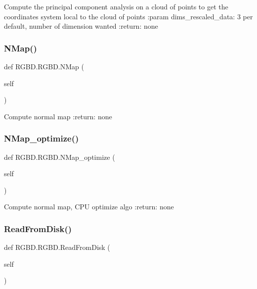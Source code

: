 \begin{DoxyVerb}Compute the principal component analysis on a cloud of points
to get the coordinates system local to the cloud of points
:param dims_rescaled_data: 3 per default, number of dimension wanted
:return:  none
\end{DoxyVerb}
 \mbox{\label{class_r_g_b_d_1_1_r_g_b_d_a9cba8018f1cdb3f5c73c863a49549061}} 
\subsubsection{N\+Map()}
{\footnotesize\ttfamily def R\+G\+B\+D.\+R\+G\+B\+D.\+N\+Map (\begin{DoxyParamCaption}\item[{}]{self }\end{DoxyParamCaption})}

\begin{DoxyVerb}Compute normal map
:return: none
\end{DoxyVerb}
 \mbox{\label{class_r_g_b_d_1_1_r_g_b_d_ae269b01a123ea0c10cd0317b510e7ef9}} 
\subsubsection{N\+Map\+\_\+optimize()}
{\footnotesize\ttfamily def R\+G\+B\+D.\+R\+G\+B\+D.\+N\+Map\+\_\+optimize (\begin{DoxyParamCaption}\item[{}]{self }\end{DoxyParamCaption})}

\begin{DoxyVerb}Compute normal map, CPU optimize algo
:return: none
\end{DoxyVerb}
 \mbox{\label{class_r_g_b_d_1_1_r_g_b_d_a65ca0d3759c2b9977b24c952b9057ac9}} 
\subsubsection{Read\+From\+Disk()}
{\footnotesize\ttfamily def R\+G\+B\+D.\+R\+G\+B\+D.\+Read\+From\+Disk (\begin{DoxyParamCaption}\item[{}]{self }\end{DoxyParamCaption})}

